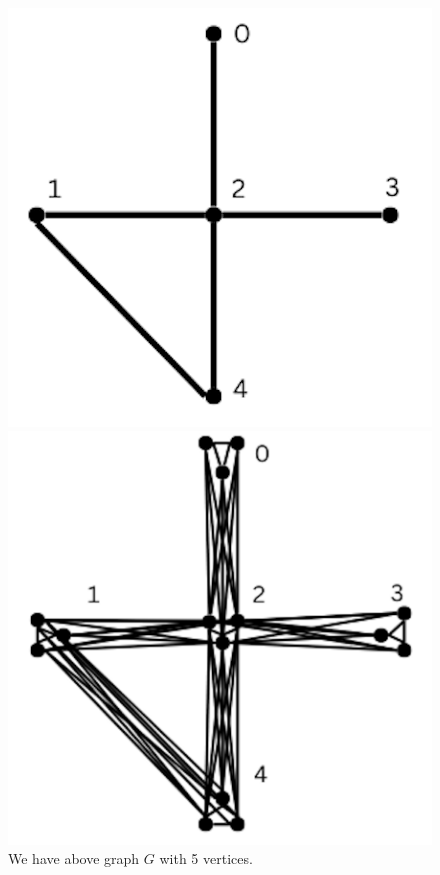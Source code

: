 \documentclass{article}
\begin{document}
\begin{enumerate}
\begin{enumerate}
        \begin{figure}[H]
            \centering
            \begin{minipage}{0.3\textwidth}
                \centering
                \includegraphics[width=\textwidth]{image7.png}
                \caption{We have above graph $G$ with 5 vertices.}
            \end{minipage}
            \hspace{0.5cm}
            \begin{minipage}{0.3\textwidth}
                \centering
                \includegraphics[width=\textwidth]{image8.png}

\end{minipage}
\end{figure}
\end{enumerate}
\end{enumerate}
\end{document}
